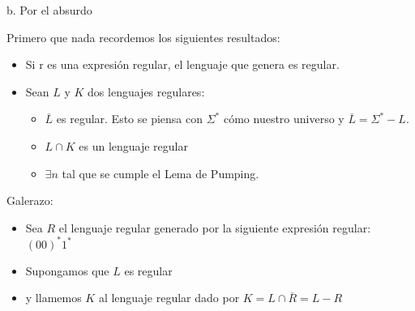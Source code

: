 \documentclass[presentation
]{beamer}
\begin{document}
\begin{frame}{b. Por el absurdo}

Primero que nada recordemos los siguientes resultados:

\begin{itemize}
\item Si r es una expresión regular, el lenguaje que genera es regular.
\item Sean $L$ y $K$ dos lenguajes regulares:
\begin{itemize}
\item $\overline{L}$ es regular. Esto se piensa con $\Sigma^*$ cómo nuestro universo y $\overline{L} = \Sigma^* - L$.
\item $L \cap K$ es un lenguaje regular
\item $\exists n $ tal que se cumple el Lema de Pumping.
\end{itemize}
\end{itemize}

\pause

Galerazo:
\begin{itemize}
\item Sea $R$ el lenguaje regular generado por la siguiente expresión regular: $(00)^*1^*$
\pause 
\item Supongamos que $L$ es regular
\pause
\item y llamemos $K$ al lenguaje regular dado por $K = L\cap \overline{R} = L - R$
\end{itemize}



\end{frame}
\end{document}
